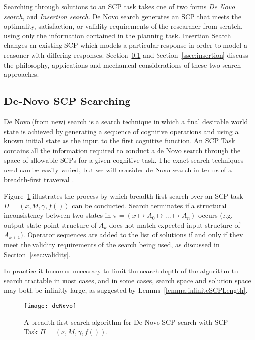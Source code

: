Searching through solutions to an SCP task takes one of two forms \textit{De Novo search}, and \textit{Insertion search}. De Novo search generates an SCP that meets the optimality, satisfaction, or validity requirements of the researcher from scratch, using only the information contained in the planning task. Insertion Search changes an existing SCP which models a particular response in order to model a reasoner with differing responses. Section~\ref{ssec:denovo} and Section~\ref{ssec:insertion} discuss the philosophy, applications and mechanical considerations of these two search approaches.





\subsection{De-Novo SCP Searching} \label{ssec:denovo}
De Novo (from new) search is a search technique in which a final desirable world state is achieved by generating a sequence of cognitive operations and using a known initial state as the input to the first cognitive function. An SCP Task contains all the information required to conduct a de Novo search through the space of allowable SCPs for a given cognitive task. The exact search techniques used can be easily varied, but we will consider de Novo search in terms of a breadth-first traversal \cite{zhou2006breadth}. 

Figure~\ref{fig:deNovo} illustrates the process by which breadth first search over an SCP task $\Pi=(x,M,\gamma,f())$ can be conducted. Search terminates if a structural inconsistency between two states in $\pi=(x\longmapsto A_0 \longmapsto ... \longmapsto A_n)$ occurs (e.g. output state point structure of $A_k$ does not match expected input structure of $A_{k+1}$). Operator sequences are added to the list of solutions if and only if they meet the validity requirements of the search being used, as discussed in Section~\ref{ssec:validity}. 

In practice it becomes necessary to limit the search depth of the algorithm to search tractable in most cases, and in some cases, search space and solution space may both be infinitly large, as suggested by Lemma~\ref{lemma:infiniteSCPLength}.

\begin{figure}
\begin{center}
\texttt{[image: deNovo]}
\end{center}
\caption{A breadth-first search algorithm for De Novo SCP search with SCP Task $\Pi=(x,M,\gamma,f())$.}
\label{fig:deNovo}
\end{figure}

